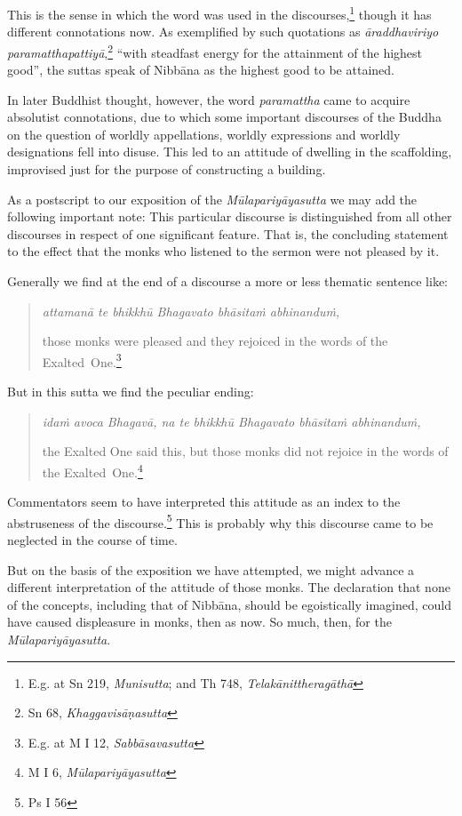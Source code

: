 This is the sense in which the word was used in the discourses,\footnote{E.g. at Sn 219, \emph{Munisutta}; and Th 748, \emph{Telakānittheragāthā}} though it has different connotations now. As exemplified by such quotations as \emph{āraddhaviriyo paramatthapattiyā},\footnote{Sn 68, \emph{Khaggavisāṇasutta}} ``with steadfast energy for the attainment of the highest good'', the suttas speak of Nibbāna as the highest good to be attained.

In later Buddhist thought, however, the word \emph{paramattha} came to acquire absolutist connotations, due to which some important discourses of the Buddha on the question of worldly appellations, worldly expressions and worldly designations fell into disuse. This led to an attitude of dwelling in the scaffolding, improvised just for the purpose of constructing a building.

As a postscript to our exposition of the \emph{Mūlapariyāyasutta} we may add the following important note: This particular discourse is distinguished from all other discourses in respect of one significant feature. That is, the concluding statement to the effect that the monks who listened to the sermon were not pleased by it.

Generally we find at the end of a discourse a more or less thematic sentence like:

\begin{quote}
\emph{attamanā te bhikkhū Bhagavato bhāsitaṁ abhinanduṁ,}

those monks were pleased and they rejoiced in the words of the Exalted~One.\footnote{E.g. at M I 12, \emph{Sabbāsavasutta}}
\end{quote}

But in this sutta we find the peculiar ending:

\begin{quote}
\emph{idaṁ avoca Bhagavā, na te bhikkhū Bhagavato bhāsitaṁ abhinanduṁ,}

the Exalted One said this, but those monks did not rejoice in the words of the Exalted~One.\footnote{M I 6, \emph{Mūlapariyāyasutta}}
\end{quote}

Commentators seem to have interpreted this attitude as an index to the abstruseness of the discourse.\footnote{Ps I 56} This is probably why this discourse came to be neglected in the course of time.

But on the basis of the exposition we have attempted, we might advance a different interpretation of the attitude of those monks. The declaration that none of the concepts, including that of Nibbāna, should be egoistically imagined, could have caused displeasure in monks, then as now. So much, then, for the \emph{Mūlapariyāyasutta}.


